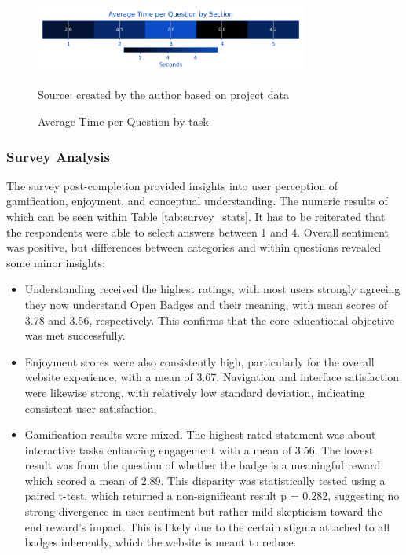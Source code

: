 \begin{figure}[hbtp]
\centering
\includegraphics[width=0.8\textwidth]{figures/heatmap_time_per_q.png}
\caption{Average Time per Question by task}
\label{fig:q_hm}
{\raggedright \small{Source: created by the author based on project data}\par}
\end{figure}

\subsubsection{Survey Analysis}

The survey post-completion provided insights into user perception of gamification, enjoyment, and conceptual understanding. 
The numeric results of which can be seen within Table \ref{tab:survey_stats}. 
It has to be reiterated that the respondents were able to select answers between 1 and 4.
Overall sentiment was positive, but differences between categories and within questions revealed some minor insights:

\begin{itemize}
        \item Understanding received the highest ratings, with most users strongly agreeing they now understand Open Badges and their meaning, with mean scores of 3.78 and 3.56, respectively. 
        This confirms that the core educational objective was met successfully.
        \item Enjoyment scores were also consistently high, particularly for the overall website experience, with a mean of 3.67. 
        Navigation and interface satisfaction were likewise strong, with relatively low standard deviation, indicating consistent user satisfaction.
        \item Gamification results were mixed. The highest-rated statement was about interactive tasks enhancing engagement with a mean of 3.56. 
        The lowest result was from the question of whether the badge is a meaningful reward, which scored a mean of 2.89. 
        This disparity was statistically tested using a paired t-test, which returned a non-significant result p = 0.282, suggesting no strong divergence in user sentiment but rather mild skepticism toward the end reward's impact. 
        This is likely due to the certain stigma attached to all badges inherently, which the website is meant to reduce.
\end{itemize}


